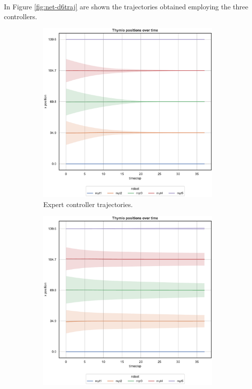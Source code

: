 In Figure \ref{fig:net-d6traj} are shown the trajectories obtained employing the 
three controllers. 
\begin{figure}[!htb]
	\begin{center}
		\begin{subfigure}[h]{0.49\textwidth}
			\centering
			\includegraphics[width=.95\textwidth]{contents/images/net-d6/position-overtime-omniscient}%
			\caption{Expert controller trajectories.}
		\end{subfigure}
		\hfill
		\begin{subfigure}[h]{0.49\textwidth}
			\centering
			\includegraphics[width=.95\textwidth]{contents/images/net-d6/position-overtime-learned_distributed}

\end{subfigure}
\end{center}
\end{figure}
